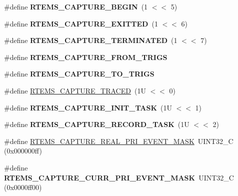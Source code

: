 \begin{DoxyCompactItemize}
\item 
\mbox{\label{group__libmisc__capture_ga741b13172c1fd9df1c0046aa43da0a58}} 
\#define {\bfseries R\+T\+E\+M\+S\+\_\+\+C\+A\+P\+T\+U\+R\+E\+\_\+\+B\+E\+G\+IN}~(1 $<$$<$ 5)
\item 
\mbox{\label{group__libmisc__capture_ga80588172ac9ddb3c94e3299bb76b3f24}} 
\#define {\bfseries R\+T\+E\+M\+S\+\_\+\+C\+A\+P\+T\+U\+R\+E\+\_\+\+E\+X\+I\+T\+T\+ED}~(1 $<$$<$ 6)
\item 
\mbox{\label{group__libmisc__capture_ga7e7e3a0655e001192a2ab0cbb90e1579}} 
\#define {\bfseries R\+T\+E\+M\+S\+\_\+\+C\+A\+P\+T\+U\+R\+E\+\_\+\+T\+E\+R\+M\+I\+N\+A\+T\+ED}~(1 $<$$<$ 7)
\item 
\#define {\bfseries R\+T\+E\+M\+S\+\_\+\+C\+A\+P\+T\+U\+R\+E\+\_\+\+F\+R\+O\+M\+\_\+\+T\+R\+I\+GS}
\item 
\#define {\bfseries R\+T\+E\+M\+S\+\_\+\+C\+A\+P\+T\+U\+R\+E\+\_\+\+T\+O\+\_\+\+T\+R\+I\+GS}
\item 
\#define \mbox{\hyperlink{group__libmisc__capture_ga516b8fbfc1ee765f50eee329ad857c97}{R\+T\+E\+M\+S\+\_\+\+C\+A\+P\+T\+U\+R\+E\+\_\+\+T\+R\+A\+C\+ED}}~(1\+U $<$$<$ 0)
\item 
\mbox{\label{group__libmisc__capture_gaf396f3c5d7a77bad44f461cfbfa8f6ab}} 
\#define {\bfseries R\+T\+E\+M\+S\+\_\+\+C\+A\+P\+T\+U\+R\+E\+\_\+\+I\+N\+I\+T\+\_\+\+T\+A\+SK}~(1\+U $<$$<$ 1)
\item 
\mbox{\label{group__libmisc__capture_ga02e1a124cd688756897aeae25a1016e5}} 
\#define {\bfseries R\+T\+E\+M\+S\+\_\+\+C\+A\+P\+T\+U\+R\+E\+\_\+\+R\+E\+C\+O\+R\+D\+\_\+\+T\+A\+SK}~(1\+U $<$$<$ 2)
\item 
\#define \mbox{\hyperlink{group__libmisc__capture_gabd6dede4fe29999cbb25cc3382bc0a8c}{R\+T\+E\+M\+S\+\_\+\+C\+A\+P\+T\+U\+R\+E\+\_\+\+R\+E\+A\+L\+\_\+\+P\+R\+I\+\_\+\+E\+V\+E\+N\+T\+\_\+\+M\+A\+SK}}~U\+I\+N\+T32\+\_\+C (0x000000ff)
\item 
\mbox{\label{group__libmisc__capture_ga68dae4467f3517a16f55362b589576e7}} 
\#define {\bfseries R\+T\+E\+M\+S\+\_\+\+C\+A\+P\+T\+U\+R\+E\+\_\+\+C\+U\+R\+R\+\_\+\+P\+R\+I\+\_\+\+E\+V\+E\+N\+T\+\_\+\+M\+A\+SK}~U\+I\+N\+T32\+\_\+C (0x0000ff00)

\end{DoxyCompactItemize}
